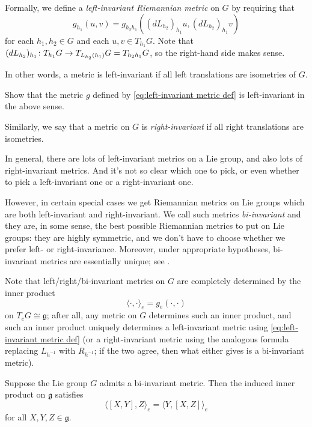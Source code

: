 Formally, we define a \emph{left-invariant Riemannian metric} on $G$ by requiring that
\[
	g_{h_1}(u,v) = g_{h_2h_1}((dL_{h_2})_{h_1}u, (dL_{h_2})_{h_1}v)
\]
for each $h_1,h_2 \in G$ and each $u,v \in T_{h_1}G$. Note that $(dL_{h_2})_{h_1} \colon\thinspace\! T_{h_1}G \to T_{L_{h_2}(h_1)}G = T_{h_2h_1}G$, so the right-hand side makes sense.

In other words, a metric is left-invariant if all left translations are isometries of $G$.

\begin{exercise}
	Show that the metric $g$ defined by \eqref{eq:left-invariant metric def} is left-invariant in the above sense.
\end{exercise}

Similarly, we say that a metric on $G$ is \emph{right-invariant} if all right translations are isometries. 

In general, there are lots of left-invariant metrics on a Lie group, and also lots of right-invariant metrics. And it's not so clear which one to pick, or even whether to pick a left-invariant one or a right-invariant one. 

However, in certain special cases we get Riemannian metrics on Lie groups which are both left-invariant and right-invariant. We call such metrics \emph{bi-invariant} and they are, in some sense, the best possible Riemannian metrics to put on Lie groups: they are highly symmetric, and we don't have to choose whether we prefer left- or right-invariance. Moreover, under appropriate hypotheses, bi-invariant metrics are essentially unique; see .

Note that left/right/bi-invariant metrics on $G$ are completely determined by the inner product
\[
	\langle \cdot , \cdot \rangle_e = g_e(\cdot , \cdot)
\]
on $T_eG \cong \mathfrak{g}$; after all, any metric on $G$ determines such an inner product, and such an inner product uniquely determines a left-invariant metric using \eqref{eq:left-invariant metric def} (or a right-invariant metric using the analogous formula replacing $L_{h^{-1}}$ with $R_{h^{-1}}$; if the two agree, then what either gives is a bi-invariant metric).

\begin{proposition}\label{prop:characterization of bi-invariant metric}
	Suppose the Lie group $G$ admits a bi-invariant metric. Then the induced inner product on $\mathfrak{g}$ satisfies
	\[
		\langle [X,Y],Z\rangle_e = \langle Y, [X,Z]\rangle_e
	\]
	for all $X,Y,Z \in \mathfrak{g}$.
\end{proposition}

